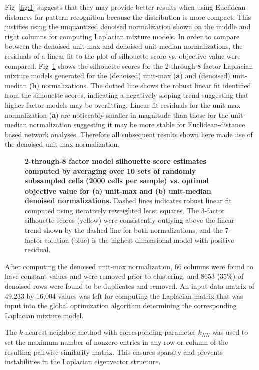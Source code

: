 \documentclass[10pt,letterpaper]{article}
\begin{document}
Fig~\ref{fig:1} suggests that they may provide better results when using Euclidean distances for pattern recognition because the distribution is more compact.
This justifies using the unquantized denoised normalization shown on the middle and right columns for computing Laplacian mixture models.
In order to compare between the denoised unit-max and denoised unit-median normalizations, the residuals of a linear fit to the plot of silhouette score vs. objective value were compared.
Fig~\ref{fig:2} shows the silhouette scores for the 2-through-8 factor Laplacian mixture models generated for the (denoised) unit-max (\textbf{a}) and (denoised) unit-median (\textbf{b}) normalizations.
The dotted line shows the robust linear fit identified from the silhouette scores, indicating a negatively sloping trend suggesting that higher factor models may be overfitting.
Linear fit residuals for the unit-max normalization (\textbf{a}) are noticeably smaller in magnitude than those for the unit-median normalization suggesting it may be more stable for Euclidean-distance based network analyses.
Therefore all subsequent results shown here made use of the denoised unit-max normalization.
\begin{figure}[!]
\caption{
{\bf 2-through-8 factor model silhouette score estimates computed by averaging over 10 sets of randomly subsampled cells (2000 cells per sample) vs. optimal objective value for (\textbf{a}) unit-max and (\textbf{b}) unit-median denoised normalizations.}
Dashed lines indicates robust linear fit computed using iteratively reweighted least squares.
The 3-factor silhouette scores (yellow) were consistently outlying above the linear trend shown by the dashed line for both normalizations, and the 7-factor solution (blue) is the highest dimensional model with positive residual.
}
\label{fig:2}
\end{figure}
After computing the denoised unit-max normalization, 66 columns were found to have constant values and were removed prior to clustering, and 8653 (35\%) of denoised rows were found to be duplicates and removed.
An input data matrix of 49,233-by-16,004 values was left for computing the Laplacian matrix that was input into the global optimization algorithm determining the corresponding Laplacian mixture model.

The $k$-nearest neighbor method with corresponding parameter $k_{NN}$ was used to set the maximum number of nonzero entries in any row or column of the resulting pairwise similarity matrix.
This ensures sparsity and prevents instabilities in the Laplacian eigenvector structure.
\end{document}
